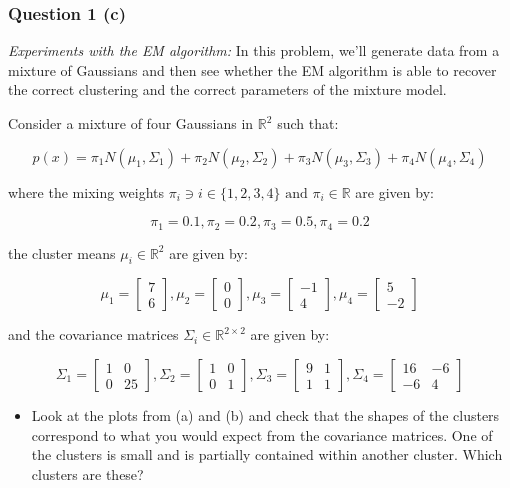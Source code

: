 \documentclass{article}
\begin{document}
\subsubsection*{Question 1 (c)}
\begin{flushleft}
\textit{Experiments with the EM algorithm:} In this problem, we'll generate data from a mixture of Gaussians and then see whether the EM algorithm is able to recover the correct clustering and the correct parameters of the mixture model.
\end{flushleft}
\begin{flushleft}
    Consider a mixture of four Gaussians in $\mathbb{R}^2$ such that:
\end{flushleft}
$$p(x) = \pi_1 N(\mu_1, \Sigma_1) + \pi_2 N(\mu_2, \Sigma_2) + \pi_3 N(\mu_3, \Sigma_3) + \pi_4 N(\mu_4, \Sigma_4)$$
\begin{flushleft}
    where the mixing weights $\pi_i \ni i \in \{1,2,3,4\} \text{ and } \pi_i \in \mathbb{R}$ are given by:
\end{flushleft}
$$\pi_1 = 0.1, \pi_2 = 0.2, \pi_3 = 0.5, \pi_4 = 0.2$$
\begin{flushleft}
    the cluster means $\mu_i \in \mathbb{R}^2$ are given by:
\end{flushleft}
$$\mu_1 = \begin{bmatrix}7 \\ 6\end{bmatrix}, \mu_2 = \begin{bmatrix}0 \\ 0\end{bmatrix}, \mu_3 = \begin{bmatrix}-1 \\ 4\end{bmatrix}, \mu_4 = \begin{bmatrix}5 \\ -2\end{bmatrix}$$
\begin{flushleft}
    and the covariance matrices $\Sigma_i \in \mathbb{R}^{2 \times 2}$ are given by:
\end{flushleft}
$$\Sigma_1 = \begin{bmatrix}1 & 0 \\ 0 & 25\end{bmatrix}, \Sigma_2 = \begin{bmatrix}1 & 0 \\ 0 & 1\end{bmatrix}, \Sigma_3 = \begin{bmatrix}9 & 1 \\ 1 & 1\end{bmatrix}, \Sigma_4 = \begin{bmatrix}16 & -6 \\ -6 & 4\end{bmatrix}$$
\begin{itemize}
    \item Look at the plots from (a) and (b) and check that the shapes of the clusters correspond to what you would expect from the covariance matrices. One of the clusters is small and is partially contained within another cluster. Which clusters are these?
\end{itemize}
\end{document}
